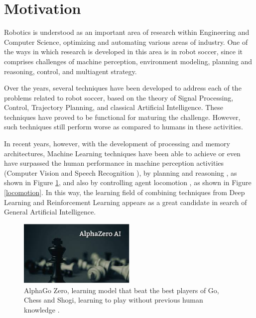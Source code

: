 \section{Motivation}

Robotics is understood as an important area of research within Engineering and Computer Science, optimizing and automating various areas of industry. One of the ways in which research is developed in this area is in robot soccer, since it comprises challenges of machine perception, environment modeling, planning and reasoning, control, and multiagent strategy.

Over the years, several techniques have been developed to address each of the problems related to robot soccer, based on the theory of Signal Processing, Control, Trajectory Planning, and classical Artificial Intelligence. These techniques have proved to be functional for maturing the challenge. However, such techniques still perform worse as compared to humans in these activities.

In recent years, however, with the development of processing and memory architectures, Machine Learning techniques have been able to achieve or even have surpassed the human performance in machine perception activities (Computer Vision \cite{DBLP:journals/corr/LuT14} and Speech Recognition \cite{DBLP:journals/corr/XiongDHSSSYZ16a}), by planning and reasoning \cite{DBLP:journals/corr/abs-1712-01815}, as shown in Figure \ref{alphazero}, and also by controlling agent locomotion \cite{DBLP:journals/corr/HeessTSLMWTEWER17}, as shown in Figure \ref{locomotion}. In this way, the learning field of combining techniques from Deep Learning and Reinforcement Learning appears as a great candidate in search of General Artificial Intelligence.


\begin{figure}[ht]
\centering
\includegraphics[width=0.5\textwidth]{Cap1/AlphaZero}
\caption{AlphaGo Zero, learning model that beat the best players of Go, Chess and Shogi, learning to play without previous human knowledge \cite{DBLP:journals/corr/abs-1712-01815}.}
\label{alphazero}
\end{figure}



